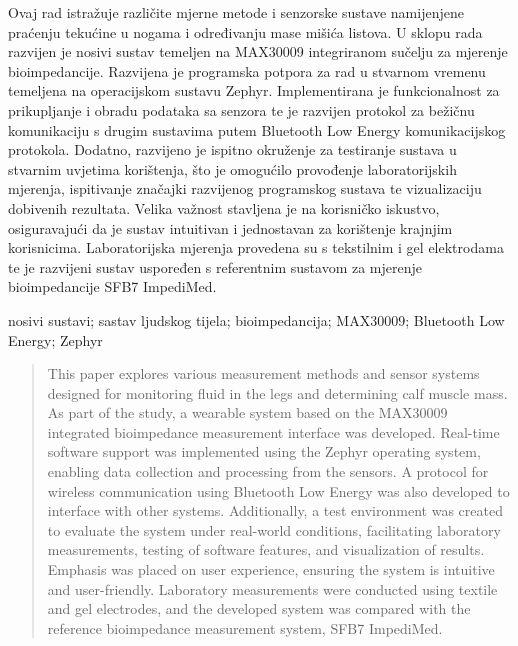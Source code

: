 \documentclass[diplomskirad, numeric, utf8, times]{fer}
\begin{document}

\begin{sazetak}

Ovaj rad istražuje različite mjerne metode i senzorske sustave namijenjene 
praćenju tekućine u nogama i određivanju mase mišića listova.
U sklopu rada razvijen je nosivi sustav temeljen na MAX30009 integriranom sučelju za mjerenje bioimpedancije. 
Razvijena je programska potpora za rad u stvarnom vremenu temeljena na operacijskom sustavu Zephyr. 
Implementirana je funkcionalnost za prikupljanje i obradu podataka sa senzora te je razvijen 
protokol za bežičnu komunikaciju s drugim sustavima putem Bluetooth Low Energy komunikacijskog protokola.
Dodatno, razvijeno je ispitno okruženje za testiranje sustava u stvarnim uvjetima korištenja, 
što je omogućilo provođenje laboratorijskih mjerenja, ispitivanje značajki razvijenog programskog sustava 
te vizualizaciju dobivenih rezultata. 
Velika važnost stavljena je na korisničko iskustvo, osiguravajući da je sustav intuitivan i 
jednostavan za korištenje krajnjim korisnicima.
Laboratorijska mjerenja provedena su s tekstilnim i gel elektrodama te je razvijeni sustav uspoređen 
s referentnim sustavom za mjerenje bioimpedancije SFB7 ImpediMed.

\end{sazetak}

\begin{kljucnerijeci}
nosivi sustavi; sastav ljudskog tijela; bioimpedancija; MAX30009; Bluetooth Low Energy; Zephyr 
\end{kljucnerijeci}


\begin{abstract}
This paper explores various measurement methods and sensor systems designed for monitoring fluid 
in the legs and determining calf muscle mass. 
As part of the study, a wearable system based on the MAX30009 integrated bioimpedance 
measurement interface was developed. 
Real-time software support was implemented using the Zephyr operating system, 
enabling data collection and processing from the sensors. 
A protocol for wireless communication using Bluetooth Low Energy 
was also developed to interface with other systems.
Additionally, a test environment was created to evaluate the system under real-world conditions, 
facilitating laboratory measurements, testing of software features, 
and visualization of results. Emphasis was placed on user experience, 
ensuring the system is intuitive and user-friendly. 
Laboratory measurements were conducted using textile and gel electrodes, 
and the developed system was compared with the reference bioimpedance measurement system, SFB7 ImpediMed.
\end{abstract}
\end{document}
